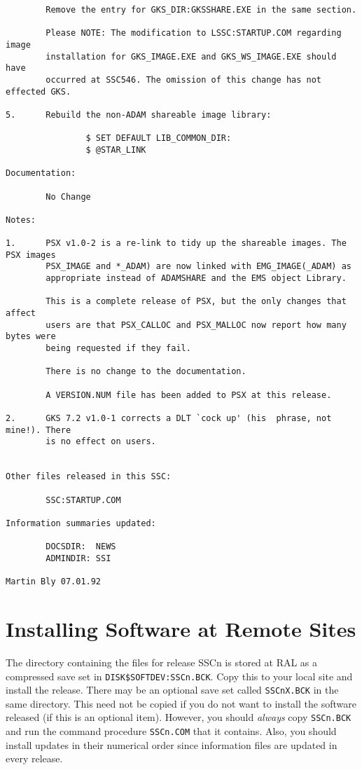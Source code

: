 \begin{verbatim}
        Remove the entry for GKS_DIR:GKSSHARE.EXE in the same section.

        Please NOTE: The modification to LSSC:STARTUP.COM regarding image
        installation for GKS_IMAGE.EXE and GKS_WS_IMAGE.EXE should have 
        occurred at SSC546. The omission of this change has not effected GKS.

5.      Rebuild the non-ADAM shareable image library:

                $ SET DEFAULT LIB_COMMON_DIR:
                $ @STAR_LINK

Documentation:

        No Change

Notes:

1.      PSX v1.0-2 is a re-link to tidy up the shareable images. The PSX images
        PSX_IMAGE and *_ADAM) are now linked with EMG_IMAGE(_ADAM) as
        appropriate instead of ADAMSHARE and the EMS object Library.

        This is a complete release of PSX, but the only changes that affect 
        users are that PSX_CALLOC and PSX_MALLOC now report how many bytes were
        being requested if they fail.

        There is no change to the documentation.

        A VERSION.NUM file has been added to PSX at this release.

2.      GKS 7.2 v1.0-1 corrects a DLT `cock up' (his  phrase, not mine!). There 
        is no effect on users.


Other files released in this SSC:               

        SSC:STARTUP.COM

Information summaries updated:

        DOCSDIR:  NEWS 
        ADMINDIR: SSI 

Martin Bly 07.01.92
\end{verbatim}

\newpage

\section {Installing Software at Remote Sites}

The directory containing the files for release SSCn is stored at RAL as a
compressed save set in {\tt DISK\$SOFTDEV:\-SSCn.\-BCK}.
Copy this to your local site and install the release.
There may be an optional save set called {\tt SSCnX.BCK} in the same directory.
This need not be copied if you do not want to install the software released
(if this is an optional item).
However, you should {\em always} copy {\tt SSCn.BCK} and run the command 
procedure {\tt SSCn.COM} that it contains.
Also, you should install updates in their numerical order since information
files are updated in every release.


